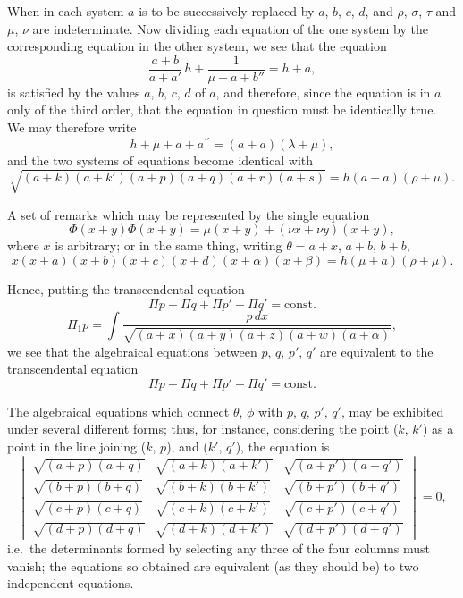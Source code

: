 \documentclass[11pt,a4paper]{article}
\theoremstyle{definition}
\begin{document}
\medskip

When in each system $a$ is to be successively replaced by $a$, $b$, $c$, $d$, and $\rho$, $\sigma$, $\tau$
and $\mu$, $\nu$ are indeterminate. Now dividing each equation of the one system by the
corresponding equation in the other system, we see that the equation
\[
\frac{a+b}{a+a'}\,h + \frac{1}{\mu+a+b''}=h+a,
\]
is satisfied by the values $a$, $b$, $c$, $d$ of $a$, and therefore, since the equation is in $a$
only of the third order, that the equation in question must be identically true. We
may therefore write
\[
h+\mu+a+a^{\prime\prime} =(a+a)(\lambda+\mu),
\]
and the two systems of equations become identical with
\[
\sqrt{(a+k)(a+k')(a+p)(a+q)(a+r)(a+s)} = h(a+a)(\rho+\mu).
\]

\medskip

\medskip
\noindent A set of remarks which may be represented by the single equation
\[
\Phi(x+y)\Phi(x+y) = \mu(x+y)+(\nu x+\nu y)(x+y),
\]
where $x$ is arbitrary; or in the same thing, writing $\theta = a + x$, $a + b$, $b + b$,
\[
x(x+a)(x+b)(x+c)(x+d)(x+\alpha)(x+\beta) = h(\mu+a)(\rho+\mu).
\]

\medskip

Hence, putting the
transcendental equation
\[
\Pi p + \Pi q + \Pi p' + \Pi q' = \mathrm{const.}
\]
\[
\Pi_1 p = \int \frac{p\,dx}{\sqrt{(a+x)(a+y)(a+z)(a+w)(a+\alpha)}},
\]
we see that the algebraical equations between $p$, $q$, $p'$, $q'$ are equivalent to the
transcendental equation
\[
\Pi p + \Pi q + \Pi p' + \Pi q' = \mathrm{const.}
\]

\medskip

The algebraical equations which connect $\theta$, $\phi$ with $p$, $q$, $p'$, $q'$, may be exhibited
under several different forms; thus, for instance, considering the point ($k$, $k'$) as
a point in the line joining ($k$, $p$), and ($k'$, $q'$), the equation is
\[
\begin{vmatrix}
\sqrt{(a+p)(a+q)} & \sqrt{(a+k)(a+k')} & \sqrt{(a+p')(a+q')} \\
\sqrt{(b+p)(b+q)} & \sqrt{(b+k)(b+k')} & \sqrt{(b+p')(b+q')} \\
\sqrt{(c+p)(c+q)} & \sqrt{(c+k)(c+k')} & \sqrt{(c+p')(c+q')} \\
\sqrt{(d+p)(d+q)} & \sqrt{(d+k)(d+k')} & \sqrt{(d+p')(d+q')}
\end{vmatrix} = 0,
\]
i.e.\ the determinants formed by selecting any three of the four columns must vanish;
the equations so obtained are equivalent (as they should be) to two independent
equations.
\end{document}
